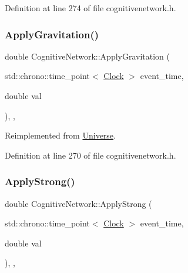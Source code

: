 Definition at line 274 of file cognitivenetwork.\+h.

\mbox{\label{class_cognitive_network_a7d3252977440a9a5c004f748647ce885}} 
\subsubsection{\texorpdfstring{Apply\+Gravitation()}{ApplyGravitation()}}
{\footnotesize\ttfamily double Cognitive\+Network\+::\+Apply\+Gravitation (\begin{DoxyParamCaption}\item[{std\+::chrono\+::time\+\_\+point$<$ \mbox{\hyperlink{universe_8h_a0ef8d951d1ca5ab3cfaf7ab4c7a6fd80}{Clock}} $>$}]{event\+\_\+time,  }\item[{double}]{val }\end{DoxyParamCaption})\hspace{0.3cm}{\ttfamily [inline]}, {\ttfamily [final]}, {\ttfamily [virtual]}}



Reimplemented from \mbox{\hyperlink{class_universe_a76c0b5e63c2a7d1988c44db341c3d64c}{Universe}}.



Definition at line 270 of file cognitivenetwork.\+h.

\mbox{\label{class_cognitive_network_a7a55750d3c42a277c4ffe04a87ab3b19}} 
\subsubsection{\texorpdfstring{Apply\+Strong()}{ApplyStrong()}}
{\footnotesize\ttfamily double Cognitive\+Network\+::\+Apply\+Strong (\begin{DoxyParamCaption}\item[{std\+::chrono\+::time\+\_\+point$<$ \mbox{\hyperlink{universe_8h_a0ef8d951d1ca5ab3cfaf7ab4c7a6fd80}{Clock}} $>$}]{event\+\_\+time,  }\item[{double}]{val }\end{DoxyParamCaption})\hspace{0.3cm}{\ttfamily [inline]}, {\ttfamily [final]}, {\ttfamily [virtual]}}



